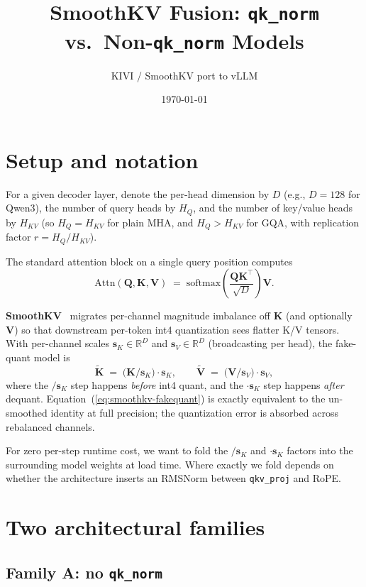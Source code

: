 \documentclass[11pt]{article}
\title{SmoothKV Fusion: \texttt{qk\_norm} vs.\ Non-\texttt{qk\_norm} Models}
\author{KIVI / SmoothKV port to vLLM}
\date{\today}
\newcommand{\sk}{\mathbf{s}_K}
\newcommand{\sv}{\mathbf{s}_V}
\newcommand{\K}{\mathbf{K}}
\newcommand{\Q}{\mathbf{Q}}
\newcommand{\V}{\mathbf{V}}
\begin{document}
\maketitle

\section{Setup and notation}

For a given decoder layer, denote the per-head dimension by $D$ (e.g., $D=128$ for Qwen3),
the number of query heads by $H_Q$, and the number of key/value heads by $H_{KV}$ (so
$H_Q=H_{KV}$ for plain MHA, and $H_Q > H_{KV}$ for GQA, with replication factor
$r = H_Q/H_{KV}$).

The standard attention block on a single query position computes
\begin{equation}
\mathrm{Attn}(\Q, \K, \V)
\;=\; \mathrm{softmax}\!\left(\frac{\Q \K^\top}{\sqrt{D}}\right)\V .
\label{eq:attn}
\end{equation}

\textbf{SmoothKV}~\cite{smoothkv} migrates per-channel magnitude imbalance off
$\K$ (and optionally $\V$) so that downstream per-token int4 quantization sees
flatter K/V tensors. With per-channel scales $\sk \in \mathbb{R}^{D}$ and
$\sv \in \mathbb{R}^{D}$ (broadcasting per head), the fake-quant model is
\begin{equation}
\tilde{\K} \;=\; \big(\K / \sk\big) \cdot \sk, \qquad
\tilde{\V} \;=\; \big(\V / \sv\big) \cdot \sv,
\label{eq:smoothkv-fakequant}
\end{equation}
where the $/\sk$ step happens \emph{before} int4 quant, and the $\cdot \sk$
step happens \emph{after} dequant. Equation~(\ref{eq:smoothkv-fakequant})
is exactly equivalent to the un-smoothed identity at full precision; the
quantization error is absorbed across rebalanced channels.

For zero per-step runtime cost, we want to fold the $/\sk$ and $\cdot\sk$
factors into the surrounding model weights at load time. Where exactly we
fold depends on whether the architecture inserts an RMSNorm between
\texttt{qkv\_proj} and RoPE.

\section{Two architectural families}

\subsection*{Family A: no \texttt{qk\_norm}}
\end{document}
